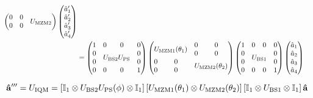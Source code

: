 \begin{equation}
\begin{split}
\begin{pmatrix}
			 0 & 0 & \multicolumn{2}{c}{\multirow{2}{*}{$U_\text{MZM2}$}} \\
			 0 & 0 & & \\
		\end{pmatrix}
		\begin{pmatrix}
			\hat{a}_1^\prime \\
			\hat{a}_2^\prime \\
			\hat{a}_3^\prime \\
			\hat{a}_4^\prime
		\end{pmatrix}
		\\
		&=
		\begin{pmatrix}
			 1 & 0 & 0 & 0 \\
			 0 & \multicolumn{2}{c}{\multirow{2}{*}{$U_\text{BS2}U_\text{PS}$}} & 0 \\
			 0 & & & 0 \\
			 0 & 0 & 0 & 1
		\end{pmatrix}
		\begin{pmatrix}
			 \multicolumn{2}{c}{\multirow{2}{*}{$U_\text{MZM1}(\theta_1)$}} & 0 & 0 \\
			 & & 0 & 0 \\
			 0 & 0 & \multicolumn{2}{c}{\multirow{2}{*}{$U_\text{MZM2}(\theta_2)$}} \\
			 0 & 0 & & \\
		\end{pmatrix}
		\begin{pmatrix}
			 1 & 0 & 0 & 0 \\
			 0 & \multicolumn{2}{c}{\multirow{2}{*}{$U_\text{BS1}$}} & 0 \\
			 0 & & & 0 \\
			 0 & 0 & 0 & 1
		\end{pmatrix}
		\begin{pmatrix}
			\hat{a}_1 \\
			\hat{a}_2 \\
			\hat{a}_3 \\
			\hat{a}_4
		\end{pmatrix}
	\end{split}
\end{equation}

\begin{equation}
	\vb{\hat{a}}^{\prime\prime\prime}
	=
	U_\text{IQM}
	=
	\left[
		\mathbb{I}_1
		\otimes
		U_\text{BS2}
		U_\text{PS}(\phi)
		\otimes
		\mathbb{I}_1
	\right]
	\left[
		U_\text{MZM1}(\theta_1)
		\otimes
		U_\text{MZM2}(\theta_2)
	\right]
	\left[
		\mathbb{I}_1
		\otimes
		U_\text{BS1}
		\otimes
		\mathbb{I}_1
	\right]
	\vb{\hat{a}}
\end{equation}

